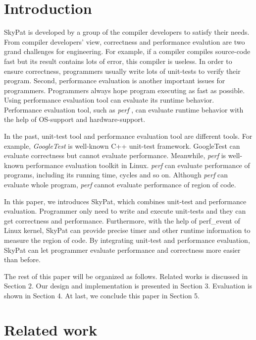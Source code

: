 \documentclass[final]{ols}
\begin{document}
\section{Introduction}
SkyPat is developed by a group of the compiler developers to satisfy their needs.
From compiler developers' view, correctness and performance evalution are two grand challenges for engineering.
For example, if a compiler compiles source-code fast but its result contains lots of error, this compiler is useless.
In order to ensure correctness, programmers usually write lots of unit-tests to verify their program.
Second, performance evaluation is another important issues for programmers.
Programmers always hope program executing as fast as possible.
Using performance evaluation tool can evaluate its runtime behavior. 
Performance evaluation tool, such as \textit{perf} \cite{perf-tools}, can evaluate runtime behavior with the help of OS-support and hardware-support.

In the past, unit-test tool and performance evaluation tool are different tools. 
For example, \textit{GoogleTest} \cite{Google-test} is well-known C++ unit-test framework.
GoogleTest can evaluate correctness but cannot evaluate performance. 
Meanwhile, \textit{perf} is well-known performance evaluation toolkit in Linux. 
\textit{perf} can evaluate performance of programs, including its running time, cycles and so on.
Although \textit{perf} can evaluate whole program, \textit{perf} cannot evaluate performance of region of code.

In this paper, we introduces SkyPat, which combines unit-test and performance evaluation.
Programmer only need to write and execute unit-tests and they can get correctness and performance.
Furthermore, with the help of perf\_event of Linux kernel, SkyPat can provide precise timer and other runtime information to measure the region of code.
By integrating unit-test and performance evaluation, SkyPat can let programmer evaluate performance and correctness more easier than before.

The rest of this paper will be organized as follows. 
Related works is discussed in Section 2. 
Our design and implementation is presented in Section 3.
Evaluation is shown in Section 4.
At last, we conclude this paper in Section 5.

\section{Related work}
\end{document}
